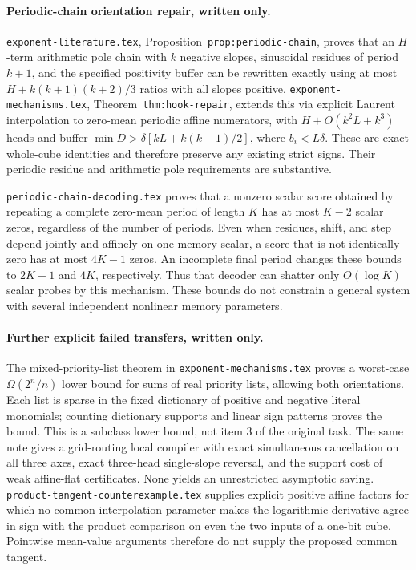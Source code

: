 \documentclass[11pt]{article}
\begin{document}
\paragraph{Periodic-chain orientation repair, written only.}
\texttt{exponent-literature.tex}, Proposition~\texttt{prop:periodic-chain},
proves that an $H$-term arithmetic pole chain with $k$ negative slopes,
sinusoidal residues of period $k+1$, and the specified positivity
buffer can be rewritten exactly using at most
$H+k(k+1)(k+2)/3$ ratios with all slopes positive.
\texttt{exponent-mechanisms.tex}, Theorem~\texttt{thm:hook-repair},
extends this via explicit Laurent interpolation to zero-mean periodic
affine numerators, with $H+O(k^2L+k^3)$ heads and buffer
$\min D>\delta[kL+k(k-1)/2]$, where $b_i<L\delta$.
These are exact whole-cube identities and therefore preserve any
existing strict signs. Their periodic residue and arithmetic pole
requirements are substantive.

\texttt{periodic-chain-decoding.tex} proves that a nonzero scalar score
obtained by repeating a complete zero-mean period of length $K$ has
at most $K-2$ scalar zeros, regardless of the number of periods.
Even when residues, shift, and step depend jointly and affinely on one
memory scalar, a score that is not identically zero has at most
$4K-1$ zeros. An incomplete final period changes these bounds to
$2K-1$ and $4K$, respectively. Thus that decoder can shatter only $O(\log K)$
scalar probes by this mechanism. These bounds do not constrain a
general system with several independent nonlinear memory parameters.

\paragraph{Further explicit failed transfers, written only.}
The mixed-priority-list theorem in \texttt{exponent-mechanisms.tex}
proves a worst-case $\Omega(2^n/n)$ lower bound for sums of real
priority lists, allowing both orientations. Each list is sparse in
the fixed dictionary of positive and negative literal monomials;
counting dictionary supports and linear sign patterns proves the
bound. This is a subclass lower bound, not item 3 of the original task.
The same note gives a grid-routing local compiler with exact
simultaneous cancellation on all three axes, exact three-head
single-slope reversal, and the support cost of weak affine-flat
certificates. None yields an unrestricted asymptotic saving.
\texttt{product-tangent-counterexample.tex} supplies explicit positive
affine factors for which no common interpolation parameter makes
the logarithmic derivative agree in sign with the product comparison
on even the two inputs of a one-bit cube. Pointwise mean-value
arguments therefore do not supply the proposed common tangent.
\end{document}
